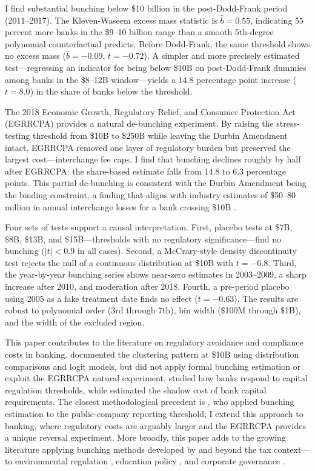 \documentclass[12pt]{article}
\begin{document}
I find substantial bunching below \$10 billion in the post-Dodd-Frank period (2011--2017). The Kleven-Waseem excess mass statistic is $\hat{b} = 0.55$, indicating 55 percent more banks in the \$9--10 billion range than a smooth 5th-degree polynomial counterfactual predicts. Before Dodd-Frank, the same threshold shows no excess mass ($\hat{b} = -0.09$, $t = -0.72$). A simpler and more precisely estimated test---regressing an indicator for being below \$10B on post-Dodd-Frank dummies among banks in the \$8--12B window---yields a 14.8 percentage point increase ($t = 8.0$) in the share of banks below the threshold.

The 2018 Economic Growth, Regulatory Relief, and Consumer Protection Act (EGRRCPA) provides a natural de-bunching experiment. By raising the stress-testing threshold from \$10B to \$250B while leaving the Durbin Amendment intact, EGRRCPA removed one layer of regulatory burden but preserved the largest cost---interchange fee caps. I find that bunching declines roughly by half after EGRRCPA: the share-based estimate falls from 14.8 to 6.3 percentage points. This partial de-bunching is consistent with the Durbin Amendment being the binding constraint, a finding that aligns with industry estimates of \$50--80 million in annual interchange losses for a bank crossing \$10B \citep{Hayashi2012, Kay2023}.

Four sets of tests support a causal interpretation. First, placebo tests at \$7B, \$8B, \$13B, and \$15B---thresholds with no regulatory significance---find no bunching ($|t| < 0.9$ in all cases). Second, a McCrary-style density discontinuity test rejects the null of a continuous distribution at \$10B with $t = -6.8$. Third, the year-by-year bunching series shows near-zero estimates in 2003--2009, a sharp increase after 2010, and moderation after 2018. Fourth, a pre-period placebo using 2005 as a fake treatment date finds no effect ($t = -0.63$). The results are robust to polynomial order (3rd through 7th), bin width (\$100M through \$1B), and the width of the excluded region.

This paper contributes to the literature on regulatory avoidance and compliance costs in banking. \citet{Bouwman2018} documented the clustering pattern at \$10B using distribution comparisons and logit models, but did not apply formal bunching estimation or exploit the EGRRCPA natural experiment. \citet{Dahl2016} studied how banks respond to capital regulation thresholds, while \citet{Kisin2014} estimated the shadow cost of bank capital requirements. The closest methodological precedent is \citet{Ewens2024}, who applied bunching estimation to the public-company reporting threshold; I extend this approach to banking, where regulatory costs are arguably larger and the EGRRCPA provides a unique reversal experiment. More broadly, this paper adds to the growing literature applying bunching methods developed by \citet{Saez2010} and \citet{Kleven2013} beyond the tax context---to environmental regulation \citep{Ito2014}, education policy \citep{Diamond2016}, and corporate governance \citep{Ewens2024}.
\end{document}
